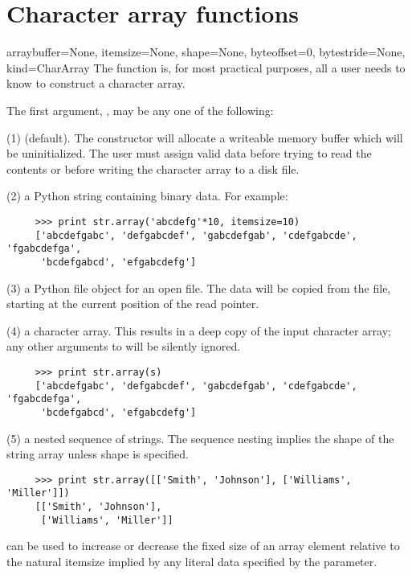 \section{Character array functions}
\label{sec:chararray-func}
\begin{funcdesc}{array}{buffer=None, itemsize=None, shape=None, byteoffset=0,
    bytestride=None, kind=CharArray}
\label{func:str.array}
   The function  is, for most practical purposes, all a user needs 
   to know to construct a character array.

   The first argument, , may be any one of the following:

   (1)  (default).  The constructor will allocate a writeable memory
   buffer which will be uninitialized.  The user must assign valid data before
   trying to read the contents or before writing the character array to a disk
   file.
   
   (2) a Python string containing binary data.  For example:
\begin{verbatim}
     >>> print str.array('abcdefg'*10, itemsize=10)
     ['abcdefgabc', 'defgabcdef', 'gabcdefgab', 'cdefgabcde', 'fgabcdefga',
      'bcdefgabcd', 'efgabcdefg']
\end{verbatim}
   
   (3) a Python file object for an open file.  The data will be copied from 
   the file, starting at the current position of the read pointer.
   
   (4) a character array.  This results in a deep copy of the input character
   array; any other arguments to  will be silently ignored.

\begin{verbatim}
     >>> print str.array(s)
     ['abcdefgabc', 'defgabcdef', 'gabcdefgab', 'cdefgabcde', 'fgabcdefga', 
      'bcdefgabcd', 'efgabcdefg']
\end{verbatim}
   
   (5) a nested sequence of strings.  The sequence nesting implies the
   shape of the string array unless shape is specified.

\begin{verbatim}
     >>> print str.array([['Smith', 'Johnson'], ['Williams', 'Miller']])
     [['Smith', 'Johnson'],
      ['Williams', 'Miller']]
\end{verbatim}

    can be used to increase or decrease the fixed size of an
   array element relative to the natural itemsize implied by any literal data
   specified by the  parameter.


\end{funcdesc}
